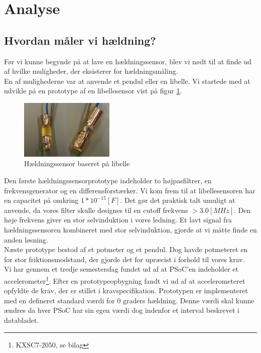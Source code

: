 \section{Analyse}
\label{ch:analyse}
\subsection{Hvordan måler vi hældning?}
Før vi kunne begynde på at lave en hældningssensor, blev vi nødt til at finde ud af hvilke muligheder, der eksisterer for hældningsmåling. \\
En af mulighederne var at anvende et pendul eller en libelle. Vi startede med at udvikle på en prototype af en libellesensor vist på figur \ref{fig:libelle}.
\begin{figure}[hbpt]
\centering
\includegraphics[width=0.4\textwidth]{billeder/libellesensor1}
\caption{Hældningssensor baseret på libelle}
\label{fig:libelle}
\end{figure}
Den første hældningssensorprototype indeholder to højpasfiltrer, en frekvensgenerator og en differensforstærker. Vi kom frem til at libellesensoren har en capacitet på omkring $1*10^{-15}[F]$. Det gør det praktisk talt umuligt at anvende, da vores filter skulle designes til en cutoff frekvens $>3.0[MHz]$. Den høje frekvens giver en stor selvinduktion i vores ledning. Et lavt signal fra hældningssensoren kombineret med stor selvinduktion, gjorde at vi måtte finde en anden løsning.\\
Næste prototype bestod af et potmeter og et pendul. Dog havde potmeteret en for stor friktionsmodstand, der gjorde det for upræcist i forhold til vores krav.\\
Vi har gennem et tredje semestersfag fundet ud af at PSoC'en indeholder et accelerometer\footnote{KXSC7-2050, se bilag}. Efter en prototypeopbygning fandt vi ud af at accelerometeret opfyldte de krav, der er stillet i kravspecifikation. Prototypen er implementeret med en defineret standard værdi for 0 graders hældning. Denne værdi skal kunne ændres da hver PSoC har sin egen værdi dog indenfor et interval beskrevet i databladet.
